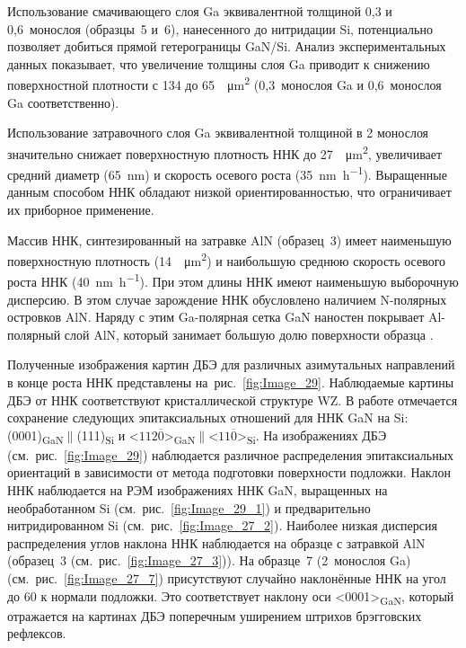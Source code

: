 Использование смачивающего слоя Ga эквивалентной толщиной 0,3 и 0,6~монослоя
(образцы~5 и~6), нанесенного до нитридации Si, потенциально позволяет добиться
прямой гетерограницы GaN/Si. Анализ экспериментальных данных показывает, что
увеличение толщины слоя Ga приводит к снижению поверхностной плотности с 134 до
65~\si{\per\micro\meter\squared} (0,3~монослоя Ga и 0,6~монослоя Ga
соответственно).

Использование затравочного слоя Ga эквивалентной толщиной в 2 монослоя
значительно снижает поверхностную плотность ННК до
27~\si{\per\micro\meter\squared}, увеличивает средний диаметр
(65~\si{\nano\meter}) и скорость осевого роста (35~\si{\nano\meter\per\hour}).
Выращенные данным способом ННК обладают низкой ориентированностью, что
ограничивает их приборное применение.

Массив ННК, синтезированный на затравке AlN (образец~3) имеет наименьшую
поверхностную плотность (14~\si{\per\micro\meter\squared}) и наибольшую среднюю
скорость осевого роста ННК (40~\si{\nano\meter\per\hour}). При этом длины ННК
имеют наименьшую выборочную дисперсию. В этом случае зарождение ННК обусловлено
наличием N-полярных островков AlN. Наряду с этим Ga-полярная сетка GaN наностен
покрывает Al-полярный слой AlN, который занимает большую долю поверхности
образца \cite{Auzelle2015}.

Полученные изображения картин ДБЭ для различных азимутальных направлений в
конце роста ННК представлены на~рис.~\cref{fig:Image_29}. Наблюдаемые картины
ДБЭ от ННК соответствуют кристаллической структуре WZ. В работе
\cite{Wierzbicka2013} отмечается сохранение следующих эпитаксиальных отношений
для ННК GaN на Si:
(0001)\textsubscript{GaN}\(\parallel\)(111)\textsubscript{Si} и
<\(112\overline{0}\)>\textsubscript{GaN}\(\parallel\)<\(11\overline{0}\)>\textsubscript{Si}.
На изображениях ДБЭ (см.~рис.~\cref{fig:Image_29}) наблюдается различное
распределения эпитаксиальных ориентаций в зависимости от метода подготовки
поверхности подложки. Наклон ННК наблюдается на РЭМ изображениях ННК GaN,
выращенных на необработанном Si (см.~рис.~\cref{fig:Image_29_1}) и
предварительно нитридированном Si (см.~рис.~\cref{fig:Image_27_2}). Наиболее
низкая дисперсия распределения углов наклона ННК наблюдается на образце с
затравкой AlN (образец~3 (см.~рис.~\cref{fig:Image_27_3})). На образце~7
(2~монослоя Ga) (см.~рис.~\cref{fig:Image_27_7}) присутствуют случайно
наклонённые ННК на угол до 60{\textdegree} к нормали подложки. Это
соответствует наклону оси <0001>\textsubscript{GaN}, который отражается на
картинах ДБЭ поперечным уширением штрихов брэгговских рефлексов.

